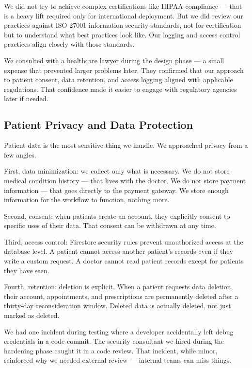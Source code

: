 \documentclass[12pt,a4paper]{report}
\begin{document}
\begin{itemize}
We did not try to achieve complex certifications like HIPAA compliance — that is a heavy lift required only for international deployment. But we did review our practices against ISO 27001 information security standards, not for certification but to understand what best practices look like. Our logging and access control practices align closely with those standards.

We consulted with a healthcare lawyer during the design phase — a small expense that prevented larger problems later. They confirmed that our approach to patient consent, data retention, and access logging aligned with applicable regulations. That confidence made it easier to engage with regulatory agencies later if needed.

\subsection{Patient Privacy and Data Protection}

Patient data is the most sensitive thing we handle. We approached privacy from a few angles.

First, data minimization: we collect only what is necessary. We do not store medical condition history — that lives with the doctor. We do not store payment information — that goes directly to the payment gateway. We store enough information for the workflow to function, nothing more.

Second, consent: when patients create an account, they explicitly consent to specific uses of their data. That consent can be withdrawn at any time.

Third, access control: Firestore security rules prevent unauthorized access at the database level. A patient cannot access another patient's records even if they write a custom request. A doctor cannot read patient records except for patients they have seen.

Fourth, retention: deletion is explicit. When a patient requests data deletion, their account, appointments, and prescriptions are permanently deleted after a thirty-day reconsideration window. Deleted data is actually deleted, not just marked as deleted.

We had one incident during testing where a developer accidentally left debug credentials in a code commit. The security consultant we hired during the hardening phase caught it in a code review. That incident, while minor, reinforced why we needed external review — internal teams can miss things.


\end{itemize}
\end{document}
